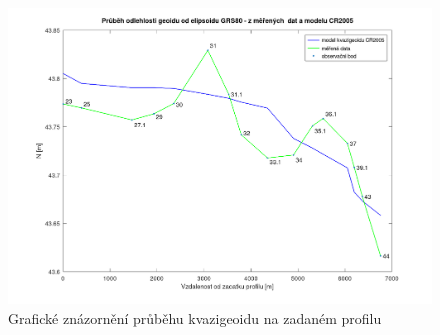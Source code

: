 
\begin{figure}[H]
    \centering
    \includegraphics[width=15cm]{graf_profil.png}
    \caption{Grafické znázornění průběhu kvazigeoidu na zadaném profilu}
    \label{fig:enter-label}
\end{figure}
